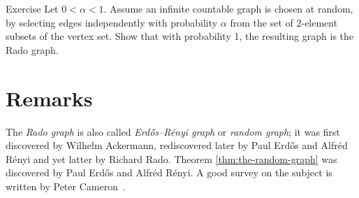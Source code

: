 \begin{thm}{Exercise}
Let $0<\alpha<1$.
Assume an infinite countable graph is chosen at random, by selecting edges independently with probability $\alpha$ from the set of 2-element subsets of the vertex set.
Show that with probability 1, the resulting graph is the Rado graph.
\end{thm}

\section*{Remarks}

The {}\emph{Rado graph} is also called \emph{Erd\H{o}s–R\'enyi graph} or \emph{random graph};
it was first discovered by Wilhelm Ackermann, rediscovered later by
Paul Erd\H{o}s and Alfr\'ed R\'enyi and yet latter by Richard Rado. 
Theorem \ref{thm:the-random-graph} was discovered by Paul Erd\H{o}s and Alfr\'ed R\'enyi.
A good survey on the subject is written by Peter Cameron~\cite{cameron}.


